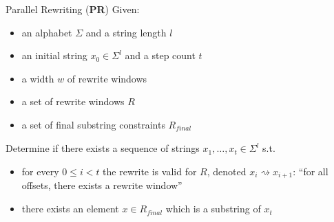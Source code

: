 \documentclass[11pt,usenames,dvipsnames,
hyperref={pdfencoding=auto,psdextra}]{beamer}
\newcommand*{\PR}{\textbf{PR}}
\begin{document}
\begin{frame}{Parallel Rewriting (\PR{})}
  Given: 
  \begin{itemize}
    \item an alphabet $\Sigma$ and a string length $l$
    \item an initial string $x_0 \in \Sigma^l$ and a step count $t$
    \item a width $w$ of rewrite windows 
    \item a set of rewrite windows $R$
    \item a set of final substring constraints $R_{\mathit{final}}$
  \end{itemize}
  Determine if there exists a sequence of strings $x_1, \ldots, x_t \in \Sigma^l$ s.t.\ 
  \begin{itemize}
    \item for every $0 \le i < t$ the rewrite is valid for $R$, denoted $x_i \rightsquigarrow x_{i+1}$: ``for all offsets, there exists a rewrite window''
    \item there exists an element $x \in R_{\mathit{final}}$ which is a substring of $x_t$
  \end{itemize}
\end{frame}
\end{document}
